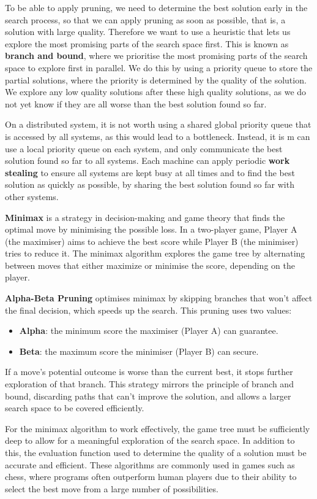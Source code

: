 \documentclass{article}
\newenvironment{aside}[1][]
  {\begin{mdframed}[style=0,%
      leftline=false,rightline=false,leftmargin=2em,rightmargin=2em,%
          innerleftmargin=0pt,innerrightmargin=0pt,linewidth=0.75pt,%
      skipabove=7pt,skipbelow=7pt,#1]\small}
  {\end{mdframed}}
\begin{document}
To be able to apply pruning, we need to determine the best solution
early in the search process, so that we can apply pruning as soon as
possible, that is, a solution with large quality. Therefore we want to
use a heuristic that lets us explore the most promising parts of the
search space first. This is known as \textbf{branch and bound}, where
we prioritise the most promising parts of the search space to explore
first in parallel. We do this by using a priority queue to store the
partial solutions, where the priority is determined by the quality of
the solution. We explore any low quality solutions after these high
quality solutions, as we do not yet know if they are all worse than the
best solution found so far.

On a distributed system, it is not worth using a shared global priority
queue that is accessed by all systems, as this would lead to a
bottleneck. Instead, it is m can use a local priority queue on each system, and only
communicate the best solution found so far to all systems. Each machine
can apply periodic \textbf{work stealing} to ensure all systems are kept
busy at all times and to find the best solution as quickly as possible,
by sharing the best solution found so far with other systems.
\begin{aside}
    \textbf{Minimax} is a strategy in decision-making and game theory
    that finds the optimal move by minimising the possible loss. In a
    two-player game, Player A (the maximiser) aims to achieve the best
    score while Player B (the minimiser) tries to reduce it. The minimax
    algorithm explores the game tree by alternating between moves that
    either maximize or minimise the score, depending on the player.

    \textbf{Alpha-Beta Pruning} optimises minimax by skipping branches
    that won't affect the final decision, which speeds up the search.
    This pruning uses two values:
    \begin{itemize}
        \item \textbf{Alpha}: the minimum score the maximiser (Player A) can guarantee.
        \item \textbf{Beta}: the maximum score the minimiser (Player B) can secure.
    \end{itemize}
    If a move's potential outcome is worse than the current best, it
    stops further exploration of that branch. This strategy mirrors the
    principle of branch and bound, discarding paths that can't improve
    the solution, and allows a larger search space to be covered
    efficiently.

    For the minimax algorithm to work effectively, the game tree must be
    sufficiently deep to allow for a meaningful exploration of the
    search space. In addition to this, the evaluation function used to
    determine the quality of a solution must be accurate and efficient.
    These algorithms are commonly used in games such as chess, where
    programs often outperform human players due to their ability to
    select the best move from a large number of possibilities.
\end{aside}
\end{document}
